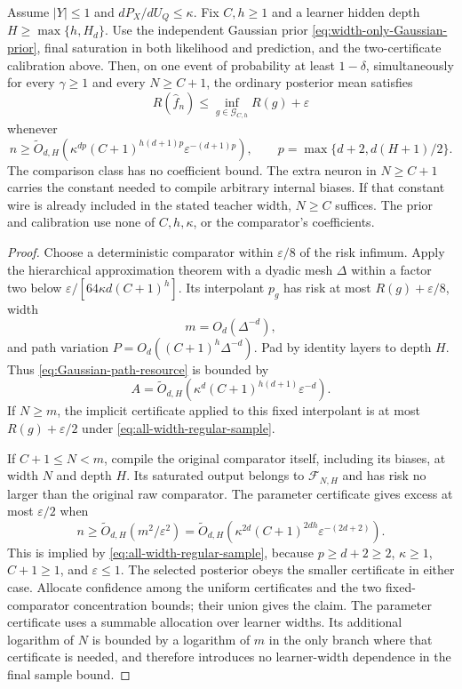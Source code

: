 \begin{theorem}
\label{thm:all-width-regular-Gaussian}
Assume $|Y|\le1$ and $dP_X/dU_Q\le\kappa$. Fix $C,h\ge1$ and a learner hidden depth $H\ge\max\{h,H_d\}$. Use the independent Gaussian prior \eqref{eq:width-only-Gaussian-prior}, final saturation in both likelihood and prediction, and the two-certificate calibration above. Then, on one event of probability at least $1-\delta$, simultaneously for every $\gamma\ge1$ and every $N\ge C+1$, the ordinary posterior mean satisfies
\[
 R(\widehat f_n)\le\inf_{g\in\mathcal G_{C,h}}R(g)+\varepsilon
\]
whenever
\begin{equation}
 n\ge\widetilde O_{d,H}\left(
   \kappa^{dp}(C+1)^{h(d+1)p}\varepsilon^{-(d+1)p}\right),
 \qquad p=\max\{d+2,d(H+1)/2\}.
 \label{eq:all-width-regular-sample}
\end{equation}
The comparison class has no coefficient bound. The extra neuron in $N\ge C+1$ carries the constant needed to compile arbitrary internal biases. If that constant wire is already included in the stated teacher width, $N\ge C$ suffices. The prior and calibration use none of $C,h,\kappa$, or the comparator's coefficients.
\end{theorem}
\begin{proof}
Choose a deterministic comparator within $\varepsilon/8$ of the risk infimum. Apply the hierarchical approximation theorem with a dyadic mesh $\Delta$ within a factor two below $\varepsilon/[64\kappa d(C+1)^h]$. Its interpolant $p_g$ has risk at most $R(g)+\varepsilon/8$, width
\[
 m=O_d(\Delta^{-d}),
\]
and path variation $P=O_d((C+1)^h\Delta^{-d})$. Pad by identity layers to depth $H$. Thus \eqref{eq:Gaussian-path-resource} is bounded by
\[
 A=\widetilde O_{d,H}\left(
      \kappa^d(C+1)^{h(d+1)}\varepsilon^{-d}\right).
\]
If $N\ge m$, the implicit certificate applied to this fixed interpolant is at most $R(g)+\varepsilon/2$ under \eqref{eq:all-width-regular-sample}.

If $C+1\le N<m$, compile the original comparator itself, including its biases, at width $N$ and depth $H$. Its saturated output belongs to $\mathcal F_{N,H}$ and has risk no larger than the original raw comparator. The parameter certificate gives excess at most $\varepsilon/2$ when
\[
 n\ge\widetilde O_{d,H}(m^2/\varepsilon^2)
 =\widetilde O_{d,H}(\kappa^{2d}(C+1)^{2dh}\varepsilon^{-(2d+2)}).
\]
This is implied by \eqref{eq:all-width-regular-sample}, because $p\ge d+2\ge2$, $\kappa\ge1$, $C+1\ge1$, and $\varepsilon\le1$. The selected posterior obeys the smaller certificate in either case. Allocate confidence among the uniform certificates and the two fixed-comparator concentration bounds; their union gives the claim. The parameter certificate uses a summable allocation over learner widths. Its additional logarithm of $N$ is bounded by a logarithm of $m$ in the only branch where that certificate is needed, and therefore introduces no learner-width dependence in the final sample bound.
\end{proof}

